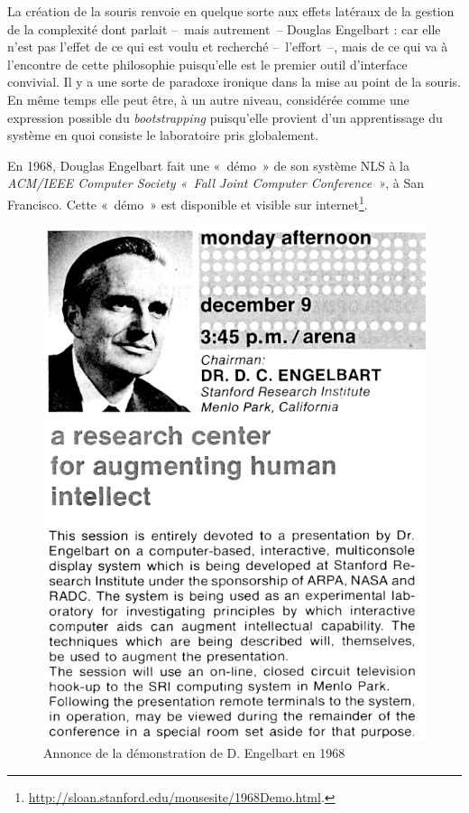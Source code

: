 \documentclass{FramateX}
\begin{document}
\begin{refsection}
La création de la souris renvoie en quelque sorte aux effets latéraux de
la gestion de la complexité dont parlait --~mais autrement~-- Douglas
Engelbart : car elle n'est pas l'effet de ce qui est voulu et recherché
--~l'effort~--, mais de ce qui va à l'encontre de cette philosophie
puisqu'elle est le premier outil d'interface convivial. Il y a une
sorte de paradoxe ironique dans la mise au point de la souris. En même
temps elle peut être, à un autre niveau, considérée comme une
expression possible du \textit{bootstrapping} puisqu'elle provient d'un
apprentissage du système en quoi consiste le laboratoire pris
globalement.

En 1968, Douglas Engelbart fait une «~démo~» de son système NLS à la
\textit{ACM/IEEE Computer Society «~Fall Joint Computer Conference~»},
 à San Francisco. Cette «~démo~» est disponible et
visible sur internet\footnote{\url{http://sloan.stanford.edu/mousesite/1968Demo.html}.}. 

\begin{figure}
\centering
\includegraphics[scale=0.25]{images/images_probert/PRobertV3-img1.jpg}
 \caption*{Annonce de la démonstration de D. Engelbart en 1968}
\end{figure}



\end{refsection}
\end{document}
